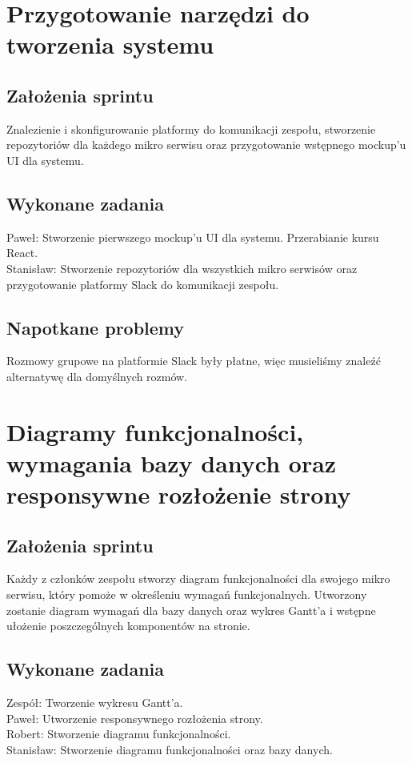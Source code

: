 \documentclass[a4paper,11pt]{report}
\begin{document}
\section {Przygotowanie narzędzi do tworzenia systemu}
\subsection {Założenia sprintu}
Znalezienie i skonfigurowanie platformy do komunikacji zespołu, stworzenie repozytoriów dla każdego mikro serwisu oraz przygotowanie wstępnego mockup'u UI dla systemu.
\subsection {Wykonane zadania}
Paweł: Stworzenie pierwszego mockup'u UI dla systemu. Przerabianie kursu React. \\
Stanisław: Stworzenie repozytoriów dla wszystkich mikro serwisów oraz przygotowanie platformy Slack do komunikacji zespołu.\\
\subsection {Napotkane problemy}
Rozmowy grupowe na platformie Slack były płatne, więc musieliśmy znaleźć alternatywę dla domyślnych rozmów.

\section {Diagramy funkcjonalności, wymagania bazy danych oraz responsywne rozłożenie strony}
\subsection {Założenia sprintu}
Każdy z członków zespołu stworzy diagram funkcjonalności dla swojego mikro serwisu, który pomoże w określeniu wymagań funkcjonalnych. Utworzony zostanie diagram wymagań dla bazy danych oraz wykres Gantt’a i wstępne ułożenie poszczególnych komponentów na stronie.
\subsection {Wykonane zadania}
Zespół: Tworzenie wykresu Gantt'a.\\
Paweł: Utworzenie responsywnego rozłożenia strony. \\
Robert: Stworzenie diagramu funkcjonalności. \\
Stanisław: Stworzenie diagramu funkcjonalności oraz bazy danych.\\
\end{document}
